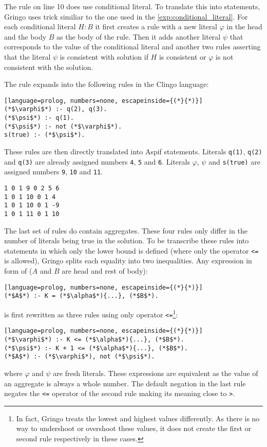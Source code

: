 \begin{example}
    The rule on line 10 does use conditional literal.
    To translate this into statements, Gringo uses trick similiar to the one used
    in the \cref{exp:conditional_literal}.
    For each conditional literal $H : B$ it first creates a rule with a new literal
    $\varphi$ in the head and the body $B$ as the body of the rule.
    Then it adds another literal $\psi$ that corresponds to the value of
    the conditional literal and another two rules asserting that the literal
    $\psi$ is consistent with solution if $H$ is consistent or
    $\varphi$ is not consistent with the solution.

    The rule expands into the following rules in the Clingo language:
    \begin{lstlisting}[language=prolog, numbers=none, escapeinside={(*}{*)}]
(*$\varphi$*) :- q(2), q(3).
(*$\psi$*) :- q(1).
(*$\psi$*) :- not (*$\varphi$*).
s(true) :- (*$\psi$*).
\end{lstlisting}
    These rules are then directly translated into Aspif statements.
    Literals \texttt{q(1)}, \texttt{q(2)} and \texttt{q(3)} are already
    assigned numbers \texttt{4}, \texttt{5} and \texttt{6}. Literals
    $\varphi$, $\psi$ and \texttt{s(true)} are assigned numbers 
    \texttt{9}, \texttt{10} and \texttt{11}.
    \begin{lstlisting}[firstnumber=10]
1 0 1 9 0 2 5 6
1 0 1 10 0 1 4
1 0 1 10 0 1 -9
1 0 1 11 0 1 10
\end{lstlisting}

    The last set of rules do contain aggregates. These four rules only differ
    in the number of literals being true in the solution.
    To be transcribe these rules into statements in which only the lower bound
    is defined (where only the operator \texttt{<=} is allowed),
    Gringo splits each equality into two inequalities. Any expression
    in form of ($A$ and $B$ are head and rest of body):
    \begin{lstlisting}[language=prolog, numbers=none, escapeinside={(*}{*)}]
(*$A$*) :- K = (*$\alpha$*){...}, (*$B$*).
\end{lstlisting}
    is first rewritten as three rules using only operator \texttt{<=}\footnote{
        In fact, Gringo treats the lowest and highest values differently.
        As there is no way to undershoot or overshoot these values,
        it does not create the first or second rule respectively in these cases.
    }:
    \begin{lstlisting}[language=prolog, numbers=none, escapeinside={(*}{*)}]
(*$\varphi$*) :- K <= (*$\alpha$*){...}, (*$B$*).
(*$\psi$*) :- K + 1 <= (*$\alpha$*){...}, (*$B$*).
(*$A$*) :- (*$\varphi$*), not (*$\psi$*).
\end{lstlisting}
    where $\varphi$ and $\psi$ are fresh literals.
    These expressions are equivalent as the value of an aggregate is always
    a whole number. The default negation in the last rule negates the \texttt{<=}
    operator of the second rule making its meaning close to \texttt{>}.


\end{example}
